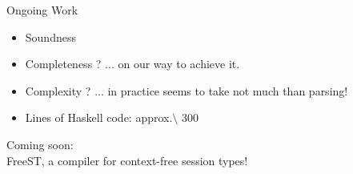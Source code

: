 \documentclass[10pt]{beamer}
\begin{document}
\begin{frame} {Ongoing Work}
	\begin{itemize}
		\item Soundness {\color{olive}\checkmark}
		\item Completeness {\color{orange}?} {\color{gray} ... on our way to achieve it.}
		\item Complexity {\color{orange}?} {\color{gray} ... in practice seems to take not much than parsing!}
		\item Lines of Haskell code: approx.$\setminus$ $300$
	\end{itemize}
	
	{\color{teal}Coming soon: }\\\smallskip
	\textsf{FreeST}, a compiler for context-free session types!\\
\end{frame}

\end{document}
